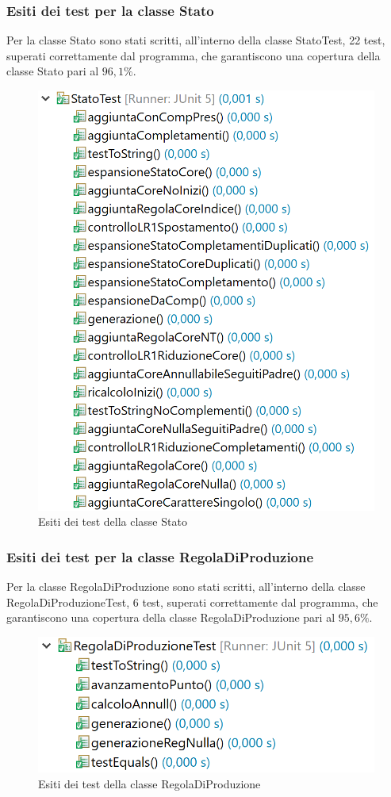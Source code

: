 \documentclass[12pt]{article}
\begin{document}
\subsubsection{Esiti dei test per la classe Stato}
Per la classe Stato sono stati scritti, all'interno della classe StatoTest, 22 test, superati correttamente dal programma, che garantiscono una copertura della classe Stato pari al $96,1\%$.
\begin{figure}[h]
\centering
\includegraphics[scale=0.4]{immagini/esitiStatoTest.png}
\caption{Esiti dei test della classe Stato}
\end{figure}
\subsubsection{Esiti dei test per la classe RegolaDiProduzione}
Per la classe RegolaDiProduzione sono stati scritti, all'interno della classe RegolaDiProduzioneTest, 6 test, superati correttamente dal programma, che garantiscono una copertura della classe RegolaDiProduzione pari al $95,6\%$.
\begin{figure}[h]
\centering
\includegraphics[scale=0.4]{immagini/esitiRegolaDiProduzioneTest.png}
\caption{Esiti dei test della classe RegolaDiProduzione}
\end{figure}
\end{document}
